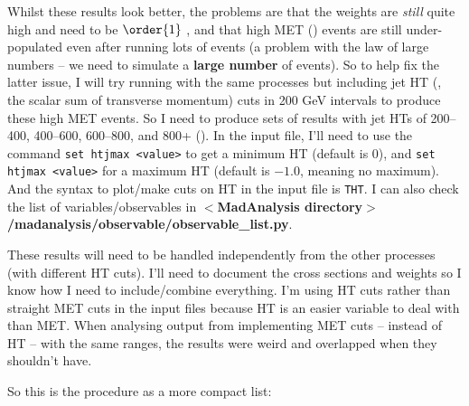 Whilst these results look better, the problems are that the weights are \emph{still} quite high and need to be $\order{1}$ , and that high MET (\etmiss) events are still under-populated even after running lots of \madgraph events (a problem with the law of large numbers -- we need to simulate a \textbf{large number} of events). So to help fix the latter issue, I will try running \madgraph with the same processes but including jet HT (\HT, the scalar sum of transverse momentum) cuts in 200 GeV intervals to produce these high MET events. So I need to produce sets of results with jet HTs of 200--400, 400--600, 600--800, and 800+ (\GeVns). In the \madgraph input file, I'll need to use the command \texttt{set htjmax <value>} to get a minimum HT (default is 0), and \texttt{set htjmax <value>} for a maximum HT (default is $-1.0$, meaning no maximum). And the syntax to plot/make cuts on HT in the \madanalysis input file is \texttt{THT}. I can also check the list of variables/observables in \textbf{$<$MadAnalysis directory$>$/madanalysis/observable/observable\_list.py}.

These results will need to be handled independently from the other processes (with different HT cuts). I'll need to document the cross sections and weights so I know how I need to include/combine everything. I'm using HT cuts rather than straight MET cuts in the \madgraph input files because HT is an easier variable to deal with than MET. When analysing output from implementing MET cuts -- instead of HT -- with the same ranges, the results were weird and overlapped when they shouldn't have.

So this is the procedure as a more compact list:


